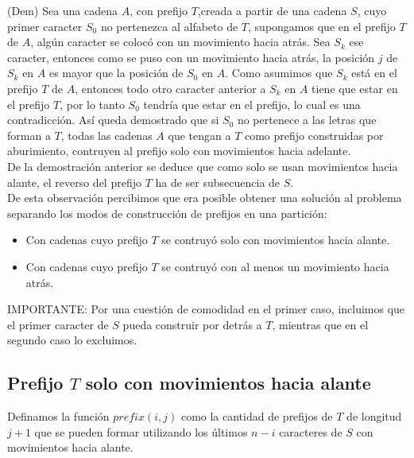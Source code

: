 \documentclass[a4paper]{article}
\begin{document}
    (Dem) Sea una cadena $A$, con prefijo $T$,creada a partir de una cadena $S$, cuyo primer caracter $S_0$ no pertenezca al alfabeto de $T$, 
    supongamos que en el prefijo $T$ de $A$, alg\'un caracter se coloc\'o con un movimiento hacia atr\'as. Sea 
    $S_k$ ese caracter, entonces como se puso con un movimiento hacia atr\'as, la posici\'on $j$ de $S_k$ en $A$
    es mayor que la posici\'on de $S_0$ en $A$. Como asumimos que $S_k$ est\'a en el prefijo $T$ de $A$, entonces todo otro caracter anterior 
    a $S_k$ en $A$ tiene que estar en el prefijo $T$, por lo tanto $S_0$ tendr\'ia que estar en el prefijo, lo cual es una contradicci\'on. As\'i queda demostrado que 
    si $S_0$ no pertenece a las letras que forman a $T$, todas las cadenas $A$ que tengan a $T$ como prefijo construidas por aburimiento, 
    contruyen al prefijo solo con movimientos hacia adelante.\\

    De la demostraci\'on anterior se deduce que como solo se usan movimientos hacia alante, el reverso del prefijo $T$ ha de ser subsecuencia de $S$.\\

    De esta observaci\'on percibimos que era posible obtener una soluci\'on al problema separando los modos de construcci\'on de prefijos 
    en una partici\'on: 

    \begin{itemize}
        \item Con cadenas cuyo prefijo $T$ se contruy\'o solo con movimientos hacia alante.
        \item Con cadenas cuyo prefijo $T$ se contruy\'o con al menos un movimiento hacia atr\'as.
    \end{itemize}

	IMPORTANTE: Por una cuestión de comodidad en el primer caso, incluimos que el primer caracter de $S$ pueda construir por detrás a $T$, mientras que en el segundo caso lo excluimos.

    \subsection*{Prefijo $T$ solo con movimientos hacia alante}

    Definamos la funci\'on $prefix(i,j)$ como la cantidad de prefijos de $T$ de longitud $j + 1$ que se pueden formar utilizando los \'ultimos $n - i$ caracteres de $S$ con movimientos hacia alante.\\
    
\end{document}
